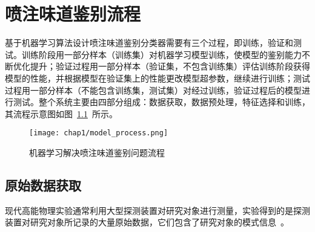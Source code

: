 \chapter{喷注味道鉴别流程}
基于机器学习算法设计喷注味道鉴别分类器需要有三个过程，即训练，验证和测试。训练阶段用一部分样本（训练集）对机器学习模型训练，使模型的鉴别能力不断优化提升；验证过程用一部分样本（验证集，不包含训练集）评估训练阶段获得模型的性能，并根据模型在验证集上的性能更改模型超参数，继续进行训练；测试过程用一部分样本（不能包含训练集，测试集）对经过训练，验证过程后的模型进行测试。整个系统主要由四部分组成：数据获取，数据预处理，特征选择和训练，其流程示意图如图~\ref{fig:model_process}~所示。
\begin{figure}[!htb]
  \centering
  \texttt{[image: chap1/model\_process.png]}
  \caption{机器学习解决喷注味道鉴别问题流程}
  \label{fig:model_process}
\end{figure}
\section{原始数据获取}
现代高能物理实验通常利用大型探测装置对研究对象进行测量，实验得到的是探测装置对研究对象所记录的大量原始数据，它们包含了研究对象的模式信息~\cite{zhengzhipeng}。